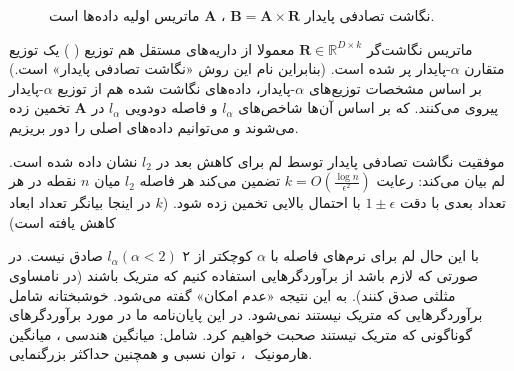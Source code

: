 \begin{figure}[h]
\centering
\begin{latin}
\end{latin}
\caption{
نگاشت تصادفی پایدار 
$\mathbf{B} = \mathbf{A} \times \mathbf{R}$
،
$\mathbf{A}$
ماتریس اولیه داده‌ها است.
}
\label{fig:matrixmulti}
\end{figure}

ماتریس نگاشت‌گر 
$\mathbf{R} \in \mathbb{R}^{D \times k}$
معمولا از داریه‌های مستقل هم توزیع (
) یک توزیع متقارن $\alpha$-پایدار پر شده است.
\cite{litez171}
(بنابراین نام این روش «نگاشت تصادفی پایدار» است.)
بر اساس مشخصات توزیع‌های $\alpha$-پایدار، داده‌های نگاشت شده هم از توزیع $\alpha$-پایدار پیروی می‌کنند. که بر اساس آن‌ها شاخص‌های $l_\alpha$ و فاصله دودویی $l_\alpha$ در $\mathbf{A}$ تخمین زده می‌شوند و می‌توانیم داده‌های اصلی را دور بریزیم.

موفقیت نگاشت تصادفی پایدار توسط لم 
\cite{litez103}
برای کاهش بعد در $l_2$ نشان داده شده است. لم
بیان می‌کند: رعایت
$k = O \left ( \frac{\log n}{\epsilon^2 } \right ) $
تضمین می‌کند هر فاصله $l_2$ میان $n$ نقطه در هر تعداد بعدی با دقت 
$1\pm\epsilon$
 با احتمال بالایی تخمین زده شود. ($k$ در اینجا بیانگر تعداد ابعاد کاهش یافته است)

با این حال لم 
برای نرم‌های فاصله با 
$\alpha$
کوچکتر از ۲ 
$l_\alpha ( \alpha < 2 )$
صادق نیست. در صورتی که لازم باشد از برآوردگرهایی استفاده کنیم که متریک باشند (در نامساوی مثلثی صدق کنند). به این نتیجه «عدم امکان»%
 گفته می‌شود.
\cite{litez39, litez109, litez33}
خوشبختانه شامل برآوردگرهایی که متریک نیستند نمی‌شود. در این پایان‌نامه ما در مورد برآوردگرهای گوناگونی که متریک نیستند صحبت خواهیم کرد. شامل: میانگین هندسی%
، میانگین هارمونیک%
‌
، توان نسبی%
و همچنین حداکثر بزرگنمایی.

